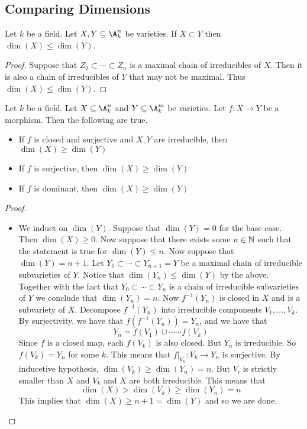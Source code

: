 \documentclass[a4paper]{article}
\begin{document}
\subsection{Comparing Dimensions}
\begin{lmm}{}{} Let $k$ be a field. Let $X,Y\subseteq\A_k^n$ be varieties. If $X\subset Y$ then $\dim(X)\leq\dim(Y)$. 
\begin{proof}
Suppose that $Z_0\subset\cdots\subset Z_n$ is a maximal chain of irreducibles of $X$. Then it is also a chain of irreducibles of $Y$ that may not be maximal. Thus $\dim(X)\leq\dim(Y)$. 
\end{proof}
\end{lmm}

\begin{prp}{}{} Let $k$ be a field. Let $X\subseteq\A_k^n$ and $Y\subseteq\A_k^m$ be varieties. Let $f:X\to Y$ be a morphism. Then the following are true. 
\begin{itemize}
\item If $f$ is closed and surjective and $X,Y$ are irreducible, then $\dim(X)\geq\dim(Y)$
\item If $f$ is surjective, then $\dim(X)\geq\dim(Y)$
\item If $f$ is dominant, then $\dim(X)\geq\dim(Y)$
\end{itemize} 
\begin{proof}~\\
\begin{itemize}
\item We induct on $\dim(Y)$. Suppose that $\dim(Y)=0$ for the base case. Then $\dim(X)\geq 0$. Now suppose that there exists some $n\in\mathbb{N}$ such that the statement is true for $\dim(Y)\leq n$. Now suppose that $\dim(Y)=n+1$. Let $Y_0\subset\cdots\subset Y_{n+1}=Y$ be a maximal chain of irreducible subvarieties of $Y$. Notice that $\dim(Y_n)\leq\dim(Y)$ by the above. Together with the fact that $Y_0\subset\cdots\subset Y_n$ is a chain of irreducible subvarieties of $Y$ we conclude that $\dim(Y_n)=n$. Now $f^{-1}(Y_n)$ is closed in $X$ and is a subvariety of $X$. Decompose $f^{-1}(Y_n)$ into irreducible components $V_1,\dots,V_k$. By surjectivity, we have that $f(f^{-1}(Y_n))=Y_n$, and we have that $$Y_n=f(V_1)\cup\cdots\cdots f(V_k)$$ Since $f$ is a closed map, each $f(V_k)$ is also closed. But $Y_n$ is irreducible. So $f(V_k)=Y_n$ for some $k$. This means that $f|_{V_k}:V_k\to Y_n$ is surjective. By inducetive hypothesis, $\dim(V_k)\geq\dim(Y_n)=n$. But $V_i$ is strictly smaller than $X$ and $V_k$ and $X$ are both irreducible. This means that $$\dim(X)>\dim(V_k)\geq\dim(Y_n)=n$$ This implies that $\dim(X)\geq n+1=\dim(Y)$ and so we are done. 
\end{itemize}
\end{proof}
\end{prp}
\end{document}
